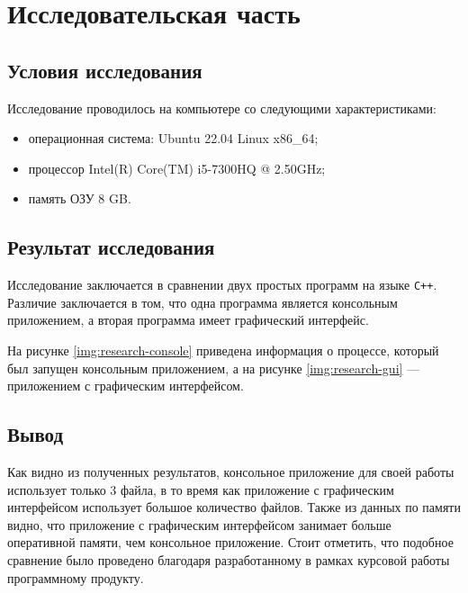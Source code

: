 \chapter{Исследовательская часть}

\section{Условия исследования}

Исследование проводилось на компьютере со следующими характеристиками:

\begin{itemize}
    \item операционная система: Ubuntu 22.04 \cite{ubuntu} Linux \cite{linux} x86\_64;
    \item процессор Intel(R) Core(TM) i5-7300HQ @ 2.50GHz;
    \item память ОЗУ 8 GB.
\end{itemize}


\section{Результат исследования}

Исследование заключается в сравнении двух простых программ на языке \texttt{C++}. Различие заключается в том, что одна программа является консольным приложением, а вторая программа имеет графический интерфейс.

На рисунке \ref{img:research-console} приведена информация о процессе, который был запущен консольным приложением, а на рисунке \ref{img:research-gui} --- приложением с графическим интерфейсом.



\section*{Вывод}

Как видно из полученных результатов, консольное приложение для своей работы использует только 3 файла, в то время как приложение с графическим интерфейсом использует большое количество файлов. Также из данных по памяти видно, что приложение с графическим интерфейсом занимает больше оперативной памяти, чем консольное приложение. Стоит отметить, что подобное сравнение было проведено благодаря разработанному в рамках курсовой работы программному продукту.
